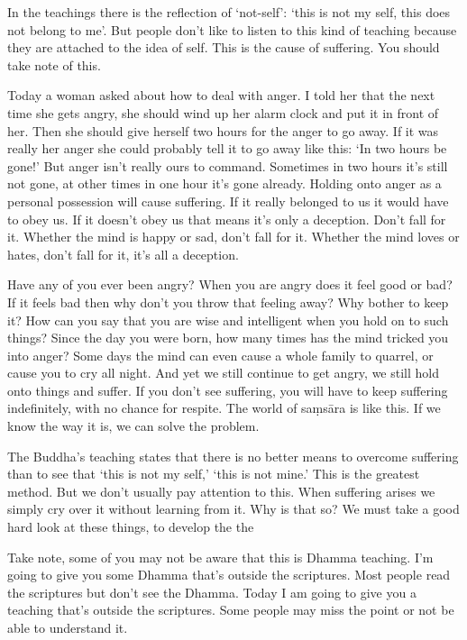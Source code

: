 In the teachings there is the reflection of `not-self': `this is not my self, this does not belong to me'. But people don't like to listen to this kind of teaching because they are attached to the idea of self. This is the cause of suffering. You should take note of this. 

Today a woman asked about how to deal with anger. I told her that the next time she gets angry, she should wind up her alarm clock and put it in front of her. Then she should give herself two hours for the anger to go away. If it was really her anger she could probably tell it to go away like this: `In two hours be gone!' But anger isn't really ours to command. Sometimes in two hours it's still not gone, at other times in one hour it's gone already. Holding onto anger as a personal possession will cause suffering. If it really belonged to us it would have to obey us. If it doesn't obey us that means it's only a deception. Don't fall for it. Whether the mind is happy or sad, don't fall for it. Whether the mind loves or hates, don't fall for it, it's all a deception. 

Have any of you ever been angry? When you are angry does it feel good or bad? If it feels bad then why don't you throw that feeling away? Why bother to keep it? How can you say that you are wise and intelligent when you hold on to such things? Since the day you were born, how many times has the mind tricked you into anger? Some days the mind can even cause a whole family to quarrel, or cause you to cry all night. And yet we still continue to get angry, we still hold onto things and suffer. If you don't see suffering, you will have to keep suffering indefinitely, with no chance for respite. The world of sa\d{m}s\=ara is like this. If we know the way it is, we can solve the problem. 

The Buddha's teaching states that there is no better means to overcome suffering than to see that `this is not my self,' `this is not mine.' This is the greatest method. But we don't usually pay attention to this. When suffering arises we simply cry over it without learning from it. Why is that so? We must take a good hard look at these things, to develop the  the 

Take note, some of you may not be aware that this is Dhamma teaching. I'm going to give you some Dhamma that's outside the scriptures. Most people read the scriptures but don't see the Dhamma. Today I am going to give you a teaching that's outside the scriptures. Some people may miss the point or not be able to understand it. 

